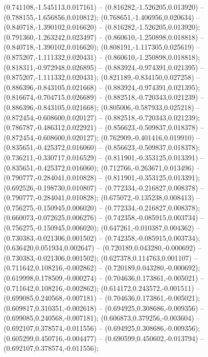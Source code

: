  (0.741108,-1.545113,0.017161) -- (0.816282,-1.526205,0.013920) -- (0.788155,-1.656856,0.010812);
 (0.768651,-1.406956,0.020634) -- (0.840718,-1.390102,0.016620) -- (0.816282,-1.526205,0.013920);
 (0.791360,-1.263242,0.023497) -- (0.860610,-1.250898,0.018818) -- (0.840718,-1.390102,0.016620);
 (0.808191,-1.117305,0.025619) -- (0.875207,-1.111332,0.020431) -- (0.860610,-1.250898,0.018818);
 (0.818311,-0.972948,0.026895) -- (0.883924,-0.974391,0.021395) -- (0.875207,-1.111332,0.020431);
 (0.821189,-0.834150,0.027258) -- (0.886396,-0.843105,0.021668) -- (0.883924,-0.974391,0.021395);
 (0.816674,-0.704715,0.026689) -- (0.882518,-0.720343,0.021239) -- (0.886396,-0.843105,0.021668);
 (0.805006,-0.587933,0.025218) -- (0.872454,-0.608600,0.020127) -- (0.882518,-0.720343,0.021239);
 (0.786787,-0.486312,0.022921) -- (0.856623,-0.509837,0.018378) -- (0.872454,-0.608600,0.020127);
 (0.762909,-0.401416,0.019910) -- (0.835651,-0.425372,0.016060) -- (0.856623,-0.509837,0.018378);
 (0.736211,-0.330717,0.016529) -- (0.811901,-0.353125,0.013391) -- (0.835651,-0.425372,0.016060);
 (0.712766,-0.263671,0.013496) -- (0.790777,-0.284041,0.010828) -- (0.811901,-0.353125,0.013391);
 (0.692526,-0.198730,0.010807) -- (0.772334,-0.216827,0.008378) -- (0.790777,-0.284041,0.010828);
 (0.675072,-0.135238,0.008413) -- (0.756275,-0.150945,0.006020) -- (0.772334,-0.216827,0.008378);
 (0.660073,-0.072625,0.006276) -- (0.742358,-0.085915,0.003734) -- (0.756275,-0.150945,0.006020);
 (0.647261,-0.010387,0.004362) -- (0.730383,-0.021306,0.001502) -- (0.742358,-0.085915,0.003734);
 (0.636420,0.051934,0.002647) -- (0.720189,0.043280,-0.000692) -- (0.730383,-0.021306,0.001502);
 (0.627378,0.114763,0.001107) -- (0.711642,0.108216,-0.002862) -- (0.720189,0.043280,-0.000692);
 (0.619998,0.178509,-0.000274) -- (0.704636,0.173861,-0.005021) -- (0.711642,0.108216,-0.002862);
 (0.614172,0.243572,-0.001511) -- (0.699085,0.240568,-0.007181) -- (0.704636,0.173861,-0.005021);
 (0.609817,0.310351,-0.002618) -- (0.694925,0.308686,-0.009356) -- (0.699085,0.240568,-0.007181);
 (0.606873,0.379256,-0.003604) -- (0.692107,0.378574,-0.011556) -- (0.694925,0.308686,-0.009356);
 (0.605299,0.450716,-0.004477) -- (0.690599,0.450602,-0.013794) -- (0.692107,0.378574,-0.011556);
